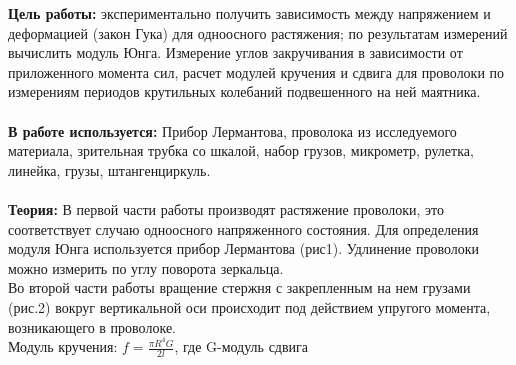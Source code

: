 \documentclass[a4paper, 12pt]{article}%
\begin{document}
	\newpage
	\textbf{Цель работы:} экспериментально получить зависимость между напряжением и деформацией (закон Гука) для одноосного растяжения; по результатам измерений вычислить модуль Юнга. Измерение углов закручивания в зависимости от приложенного момента сил, расчет модулей кручения и сдвига для проволоки по измерениям периодов крутильных колебаний подвешенного на ней маятника. \\\\
	\textbf{В работе используется:} Прибор Лермантова, проволока из исследуемого материала, зрительная трубка со шкалой, набор грузов, микрометр, рулетка, линейка, грузы, штангенциркуль.\\\\
	\textbf{Теория:} В первой части работы производят растяжение проволоки, это соответствует случаю одноосного напряженного состояния. Для определения модуля Юнга используется прибор Лермантова (рис1). Удлинение проволоки можно измерить по углу поворота зеркальца.\\
	Во второй части работы вращение стержня с закрепленным на нем грузами (рис.2) вокруг вертикальной оси происходит под действием упругого момента, возникающего в проволоке.\\
	Модуль кручения: $f=\frac{\pi R^4G}{2l}$, где G-модуль сдвига
	\begin{figure}[h]
	\end{figure}
\end{document}
